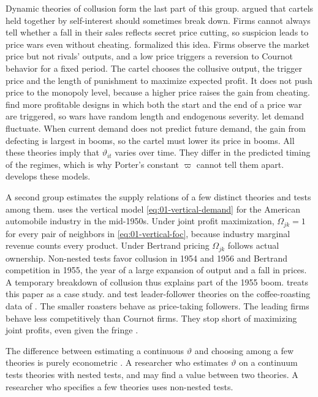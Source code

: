 Dynamic theories of collusion form the last part of this group. \citet{Stigler1964} argued that cartels held together
by self-interest should sometimes break down. Firms cannot always tell whether a fall in their sales reflects secret
price cutting, so suspicion leads to price wars even without cheating. \citet{GreenPorter1984} formalized this idea.
Firms observe the market price but not rivals' outputs, and a low price triggers a reversion to Cournot behavior for a
fixed period. The cartel chooses the collusive output, the trigger price and the length of punishment to maximize
expected profit. It does not push price to the monopoly level, because a higher price raises the gain from cheating.
\citet{AbreuPearceStacchetti1986} find more profitable designs in which both the start and the end of a price war are
triggered, so wars have random length and endogenous severity. \citet{RotembergSaloner1986} let demand fluctuate. When
current demand does not predict future demand, the gain from defecting is largest in booms, so the cartel must lower
its price in booms. All these theories imply that $\vartheta_{it}$ varies over time. They differ in the predicted
timing of the regimes, which is why Porter's constant $\varpi$ cannot tell them apart. 
develops these models.

A second group estimates the supply relations of a few distinct theories and tests among them.
\citet{Bresnahan1987} uses the vertical model \eqref{eq:01-vertical-demand} for the American automobile industry in
the mid-1950s. Under joint profit maximization, $\Omega_{jk} = 1$ for every pair of neighbors in
\eqref{eq:01-vertical-foc}, because industry marginal revenue counts every product. Under Bertrand pricing $\Omega_{jk}$
follows actual ownership.
Non-nested tests favor collusion in 1954 and 1956 and Bertrand competition in 1955, the year of a large expansion of
output and a fall in prices. A temporary breakdown of collusion thus explains part of the 1955 boom. 
treats this paper as a case study. \citet{Geroski1983} and \citet{Roberts1984} test leader-follower theories on the
coffee-roasting data of \citet{GollopRoberts1979}. The smaller roasters behave as price-taking followers. The leading
firms behave less competitively than Cournot firms. They stop short of maximizing joint profits, even given the
fringe \citep[p.~1026]{Bresnahan1989}.

The difference between estimating a continuous $\vartheta$ and choosing among a few theories is purely econometric
\citep[p.~1026]{Bresnahan1989}. A researcher who estimates $\vartheta$ on a continuum tests theories with nested tests,
and may find a value between two theories. A researcher who specifies a few theories uses non-nested tests.

